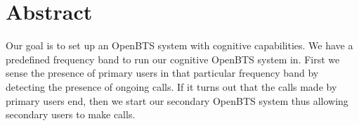 \chapter*{\centering Abstract}
Our goal is to set up an OpenBTS system with cognitive capabilities. We have a predefined frequency band to run our cognitive OpenBTS system in. First we sense the presence of primary users in that particular frequency band by detecting the presence of ongoing calls. If it turns out that the calls made by primary users end, then we start our secondary OpenBTS system thus allowing secondary users to make calls.
